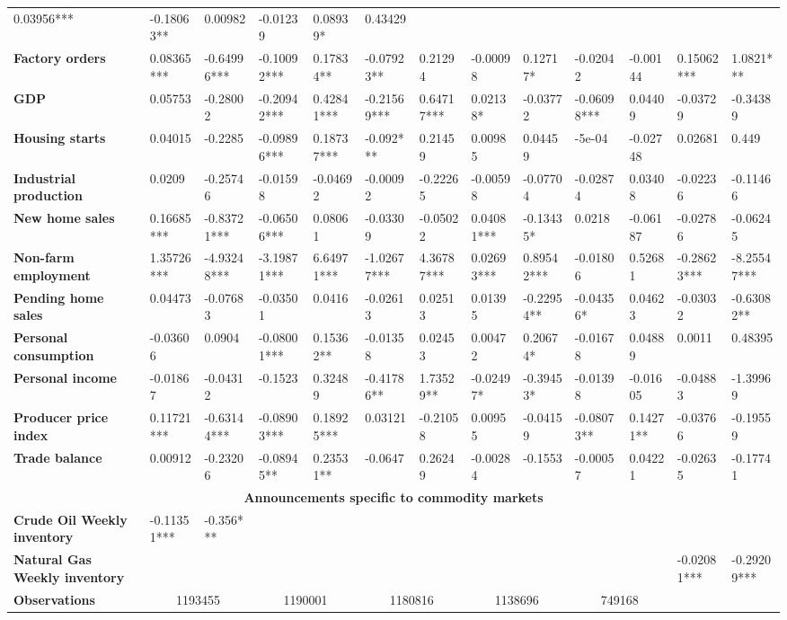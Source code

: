 \begin{sidewaystable}
{\begin{tabular}{@{}lllllllllllll@{}}
0.03956*** & -0.18063** & 0.00982 & -0.01239 & 0.08939* & 0.43429 \\ \textbf{Factory orders}& 0.08365***& -0.64996***& -0.10092*** & 0.17834** & -0.07923** & 0.21294 & -0.00098 & 0.12717* & -0.02042 & -0.00144 & 0.15062*** & 1.0821*** \\ \textbf{GDP}& 0.05753 & -0.28002 & -0.20942*** & 0.42841*** & -0.21569*** & 0.64717*** & 0.02138* & -0.03772 & -0.06098*** & 0.04409 & -0.03729 & -0.34389 \\ \textbf{Housing starts}& 0.04015 & -0.2285 & -0.09896*** & 0.18737*** & -0.092*** & 0.21459 & 0.00985 & 0.04459 & -5e-04 & -0.02748 & 0.02681 & 0.449 \\ \textbf{Industrial production}& 0.0209 & -0.25746 & -0.01598 & -0.04692 & -0.00092 & -0.22265 & -0.00598 & -0.07704 & -0.02874 & 0.03408 & -0.02236 & -0.11466 \\ \textbf{New home sales}& 0.16685*** & -0.83721*** & -0.06506*** & 0.08061 & -0.03309 & -0.05022 & 0.04081*** & -0.13435* & 0.0218 & -0.06187 & -0.02786 & -0.06245 \\ \textbf{Non-farm employment}& 1.35726*** & -4.93248*** & -3.19871*** & 6.64971*** & -1.02677*** & 4.36787*** & 0.02693*** & 0.89542*** & -0.01806 & 0.52681 & -0.28623*** & -8.25547*** \\ \textbf{Pending home sales}& 0.04473 & -0.07683 & -0.03501 & 0.0416 & -0.02613 & 0.02513 & 0.01395 & -0.22954** & -0.04356* & 0.04623 & -0.03032 & -0.63082** \\ \textbf{Personal consumption}& -0.03606 & 0.0904 & -0.08001*** & 0.15362** & -0.01358 & 0.02453 & 0.00472 & 0.20674* & -0.01678 & 0.04889 & 0.0011 & 0.48395 \\ \textbf{Personal income}& -0.01867 & -0.04312 & -0.1523 & 0.32489 & -0.41786** & 1.73529** & -0.02497* & -0.39453* & -0.01398 & -0.01605 & -0.04883 & -1.39969 \\ \textbf{Producer price index}& 0.11721*** & -0.63144*** & -0.08903*** & 0.18925*** & 0.03121 & -0.21058 & 0.00955 & -0.04159 & -0.08073** & 0.14271** & -0.03766 & -0.19559 \\ \textbf{Trade balance}& 0.00912 & -0.23206 & -0.08945** & 0.23531** & -0.0647 & 0.26249 & -0.00284 & -0.1553 & -0.00057 & 0.04221 & -0.02635 & -0.17741 \\  \midrule \multicolumn{13}{c}{\textbf{Announcements specific to commodity markets}} \\ \midrule \textbf{Crude Oil Weekly inventory}& -0.11351*** & -0.356*** &  &  &  &  &  &  &  &  &  &  \\ \textbf{Natural Gas Weekly inventory}&  &  &  &  &  &  &  &  &  &  & -0.02081*** & -0.29209*** \\  \midrule \textbf{Observations}             &\multicolumn{2}{c}{ 1193455 }                                                 & \multicolumn{2}{c}{ 1190001 }                                                 & \multicolumn{2}{c}{ 1180816 }                                                 & \multicolumn{2}{c}{ 1138696 }                                                 & \multicolumn{2}{c}{ 749168 }                                                   & 
\end{tabular}}
\end{sidewaystable}
